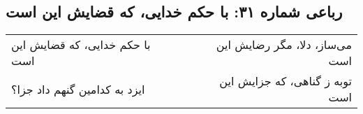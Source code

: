 \begin{center}
\section*{رباعی شماره ۳۱: با حکم خدایی، که قضایش این است}
\label{sec:031}
\begin{longtable}{l p{0.5cm} r}
با حکم خدایی، که قضایش این است
&&
می‌ساز، دلا، مگر رضایش این است
\\
ایزد به کدامین گنهم داد جزا؟
&&
توبه ز گناهی، که جزایش این است
\\
\end{longtable}
\end{center}
